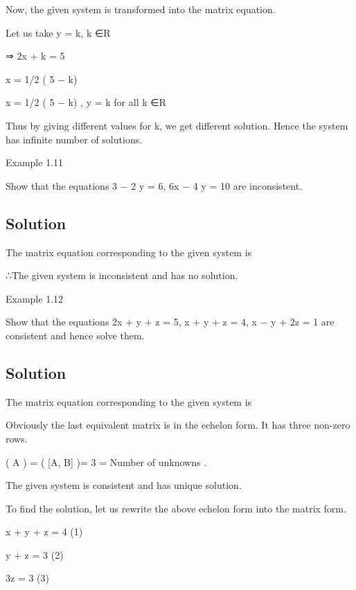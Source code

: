 \documentclass[12pt, a4paper]{article}
\begin{document}
Now, the given system is transformed into the matrix equation.



Let us take y = k, k ∈R

⇒ 2x + k = 5

x = 1/2 ( 5 − k)

x = 1/2 ( 5 − k) , y = k for all k ∈R

Thus by giving different values for k, we get different solution. Hence the system has infinite number of solutions.

 
\newpage 

Example 1.11

Show that the equations 3 \times  − 2 y = 6, 6x − 4 y = 10 are inconsistent.

\bigskip \subsection*{Solution}

The matrix equation corresponding to the given system is



∴The given system is inconsistent and has no solution.


\newpage 
 

Example 1.12

Show that the equations 2x + y + z = 5, x + y + z = 4, x − y + 2z = 1 are consistent and hence solve them.

\bigskip \subsection*{Solution}

The matrix equation corresponding to the given system is



Obviously the last equivalent matrix is in the echelon form. It has three non-zero rows.

\rho( A ) = \rho( [A, B] )= 3 = Number of unknowns .

The given system is consistent and has unique solution.

To find the solution, let us rewrite the above echelon form into the matrix form.



x + y + z = 4 (1)

 y + z = 3 (2)

3z = 3 (3)
\end{document}

